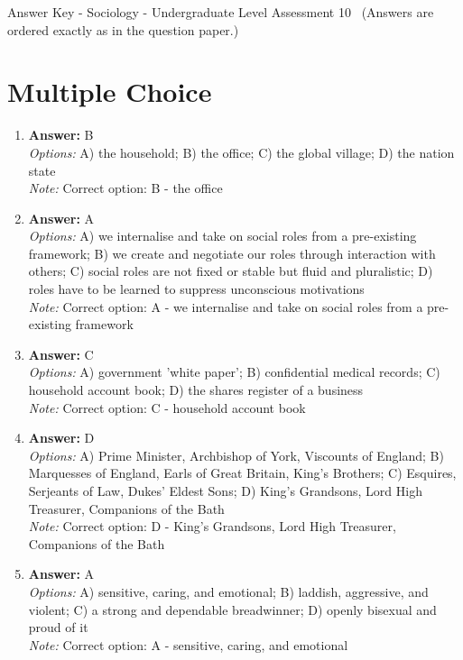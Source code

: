 \documentclass[12pt]{article}
\begin{document}
\begin{center}
Answer Key - Sociology - Undergraduate Level Assessment 10 \
\small (Answers are ordered exactly as in the question paper.)
\end{center}

\section*{Multiple Choice}
\begin{enumerate}[label=\arabic*.]
\item \textbf{Answer:} B
\\ \textit{Options:} A) the household; B) the office; C) the global village; D) the nation state
\\ \textit{Note:} Correct option: B - the office
\item \textbf{Answer:} A
\\ \textit{Options:} A) we internalise and take on social roles from a pre-existing framework; B) we create and negotiate our roles through interaction with others; C) social roles are not fixed or stable but fluid and pluralistic; D) roles have to be learned to suppress unconscious motivations
\\ \textit{Note:} Correct option: A - we internalise and take on social roles from a pre-existing framework
\item \textbf{Answer:} C
\\ \textit{Options:} A) government 'white paper'; B) confidential medical records; C) household account book; D) the shares register of a business
\\ \textit{Note:} Correct option: C - household account book
\item \textbf{Answer:} D
\\ \textit{Options:} A) Prime Minister, Archbishop of York, Viscounts of England; B) Marquesses of England, Earls of Great Britain, King's Brothers; C) Esquires, Serjeants of Law, Dukes' Eldest Sons; D) King's Grandsons, Lord High Treasurer, Companions of the Bath
\\ \textit{Note:} Correct option: D - King's Grandsons, Lord High Treasurer, Companions of the Bath
\item \textbf{Answer:} A
\\ \textit{Options:} A) sensitive, caring, and emotional; B) laddish, aggressive, and violent; C) a strong and dependable breadwinner; D) openly bisexual and proud of it
\\ \textit{Note:} Correct option: A - sensitive, caring, and emotional
\end{enumerate}
\end{document}
